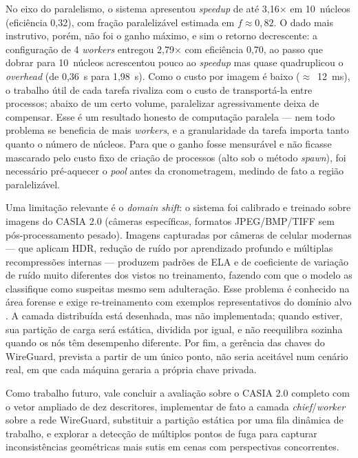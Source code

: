 \documentclass[12pt]{article}
\begin{document}
No eixo do paralelismo, o sistema apresentou \textit{speedup} de até 3,16$\times$
em 10~núcleos (eficiência 0,32), com fração paralelizável estimada em
$f \approx 0{,}82$. O dado mais instrutivo, porém, não foi o ganho máximo, e sim
o retorno decrescente: a configuração de 4 \textit{workers} entregou 2,79$\times$
com eficiência 0,70, ao passo que dobrar para 10~núcleos acrescentou pouco ao
\textit{speedup} mas quase quadruplicou o \textit{overhead} (de 0,36~s para
1,98~s). Como o custo por imagem é baixo ($\approx$~12~ms), o trabalho útil de
cada tarefa rivaliza com o custo de transportá-la entre processos; abaixo de um
certo volume, paralelizar agressivamente deixa de compensar. Esse é um resultado
honesto de computação paralela --- nem todo problema se beneficia de mais
\textit{workers}, e a granularidade da tarefa importa tanto quanto o número de
núcleos. Para que o ganho fosse mensurável e não ficasse mascarado pelo custo
fixo de criação de processos (alto sob o método \textit{spawn}), foi necessário
pré-aquecer o \textit{pool} antes da cronometragem, medindo de fato a região
paralelizável.

Uma limitação relevante é o \textit{domain shift}: o sistema foi calibrado e
treinado sobre imagens do CASIA 2.0 (câmeras específicas, formatos JPEG/BMP/TIFF
sem pós-processamento pesado). Imagens capturadas por câmeras de celular modernas
--- que aplicam HDR, redução de ruído por aprendizado profundo e múltiplas
recompressões internas --- produzem padrões de ELA e de coeficiente de variação
de ruído muito diferentes dos vistos no treinamento, fazendo com que o modelo
as classifique como suspeitas mesmo sem adulteração. Esse problema é conhecido
na área forense e exige re-treinamento com exemplos representativos do domínio
alvo \cite{farid2009}. A camada
distribuída está desenhada, mas não implementada; quando estiver, sua partição de
carga será estática, dividida por igual, e não reequilibra sozinha quando os nós
têm desempenho diferente. Por fim, a gerência das chaves do WireGuard, prevista a
partir de um único ponto, não seria aceitável num cenário real, em que cada
máquina geraria a própria chave privada.

Como trabalho futuro, vale concluir a avaliação sobre o CASIA 2.0 completo com
o vetor ampliado de dez descritores, implementar de fato a camada
\textit{chief}/\textit{worker} sobre a rede WireGuard, substituir a partição
estática por uma fila dinâmica de trabalho, e explorar a detecção de múltiplos
pontos de fuga para capturar inconsistências geométricas mais sutis em cenas com
perspectivas concorrentes.



\end{document}
